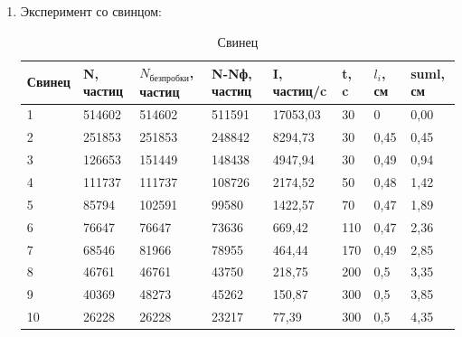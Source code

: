 \documentclass[a4paper]{article}
\begin{document}
\begin{enumerate}
    \item Эксперимент со свинцом:

    \begin{table}[H]
        \begin{center}
            \begin{tabular}{|l|l|l|l|l|l|l|l|}
                \hline
                Свинец & N, частиц & $N_{без пробки}$, частиц & N-Nф, частиц & I, частиц/c & t, c & $l_i$, см & suml, см \\ \hline
                1      & 514602    & 514602               & 511591       & 17053,03    & 30   & 0        & 0,00     \\ \hline
                2      & 251853    & 251853               & 248842       & 8294,73     & 30   & 0,45     & 0,45     \\ \hline
                3      & 126653    & 151449               & 148438       & 4947,94     & 30   & 0,49     & 0,94     \\ \hline
                4      & 111737    & 111737               & 108726       & 2174,52     & 50   & 0,48     & 1,42     \\ \hline
                5      & 85794     & 102591               & 99580        & 1422,57     & 70   & 0,47     & 1,89     \\ \hline
                6      & 76647     & 76647                & 73636        & 669,42      & 110  & 0,47     & 2,36     \\ \hline
                7      & 68546     & 81966                & 78955        & 464,44      & 170  & 0,49     & 2,85     \\ \hline
                8      & 46761     & 46761                & 43750        & 218,75      & 200  & 0,5      & 3,35     \\ \hline
                9      & 40369     & 48273                & 45262        & 150,87      & 300  & 0,5      & 3,85     \\ \hline
                10     & 26228     & 26228                & 23217        & 77,39       & 300  & 0,5      & 4,35     \\ \hline
            \end{tabular}
            \caption{Свинец}
        \end{center}
    \end{table}


\end{enumerate}
\end{document}
